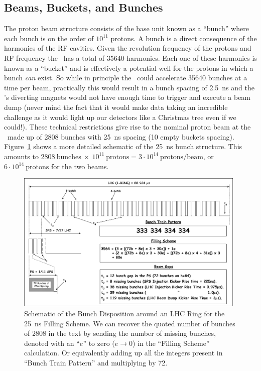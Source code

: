 \subsection{Beams, Buckets, and Bunches}
\label{sec:detector:beamsbucketsbunches}
The proton beam structure consists of the base unit known as a ``bunch'' where each bunch is on the order of $10^{11}$ protons.
A bunch is a direct consequence of the harmonics of the RF cavities.
Given the revolution frequency of the protons and RF frequency the \lhc~has a total of 35640 harmonics.
Each one of these harmonics is known as a ``bucket'' and is effectively a potential well for the protons in which a bunch \emph{can} exist.
So while in principle the \lhc\ could accelerate 35640 bunches at a time per beam, practically this would result in a bunch spacing of 2.5~ns and the \lhc's diverting magnets would not have enough time to trigger and execute a beam dump (never mind the fact that it would make data taking an incredible challenge as it would light up our detectors like a Christmas tree even if we could!).
These technical restrictions give rise to the nominal proton beam at the \lhc\ made up of 2808 bunches with 25~ns spacing (10 empty buckets spacing). 
Figure~\ref{fig:detector:bunch} shows a more detailed schematic of the 25~ns bunch structure.
This amounts to $ 2808~\text{bunches} ~\times~ 10^{11} ~\text{protons} = 3\cdot10^{14}~\text{protons/beam}$, or $6\cdot10^{14} ~\text{protons}$ for the two beams.
\begin{figure}[ht]
  \begin{center}
    \includegraphics[width=0.98\textwidth]{figs/detector/bunch_structure.png}
  \end{center}
  \caption[Schematic of the Bunch Disposition around an LHC Ring for the 25~ns Filling Scheme]{Schematic of the Bunch Disposition around an LHC Ring for the 25~ns Filling Scheme. 
  We can recover the quoted number of bunches of 2808 in the text by sending the number of missing bunches, denoted with an ``$e$'' to zero ($e \rightarrow 0$) in the ``Filling Scheme'' calculation.
  Or equivalently adding up all the integers present in ``Bunch Train Pattern'' and multiplying by 72. \cite{Bailey:691782} }
  \label{fig:detector:bunch}
\end{figure}
